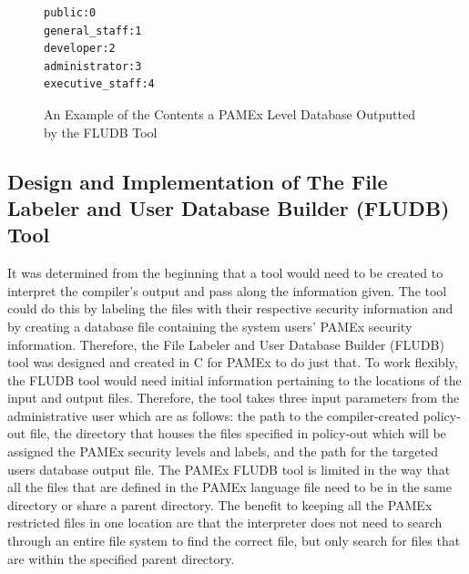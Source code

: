 \begin{figure}[htb]
    \centering
    \begin{tcolorbox}[width=.3\textwidth, boxsep=5pt, sharp corners, colback=white, colframe=black, fontupper=\footnotesize\ttfamily] %
        \begin{minipage}{\textwidth} %
            \begin{lstlisting}
public:0
general_staff:1
developer:2
administrator:3
executive_staff:4
            \end{lstlisting}
        \end{minipage}
    \end{tcolorbox}
    \caption[PAMEx Level Database Example]{\label{leveldb}An Example of the Contents a PAMEx Level Database Outputted by the FLUDB Tool}
\end{figure}


\vspace{\baselineskip}

\subsection{Design and Implementation of The File Labeler and User Database Builder (FLUDB) Tool}
\par 
\vspace{\baselineskip}
\hspace{1em}
It was determined from the beginning that a tool would need to be 
created to interpret the compiler’s output and pass along the 
information given. The tool could do this by labeling the files with 
their respective security information and by creating a database file 
containing the system users’ PAMEx security information. Therefore, the 
File Labeler and User Database Builder (FLUDB) tool was designed and 
created in C for PAMEx to do just that. To work flexibly, the FLUDB 
tool would need initial information pertaining to the locations of the 
input and output files. Therefore, the tool takes three input 
parameters from the administrative user which are as follows: the path to the compiler-created 
policy-out file, the directory that houses the files specified in 
policy-out which will be assigned the PAMEx security levels and labels, 
and the path for the targeted users database output file. The PAMEx 
FLUDB tool is limited in the way that all the files that are defined 
in the PAMEx language file need to be in the same directory or share a 
parent directory. The benefit to keeping all the PAMEx restricted 
files in one location are that the interpreter does not need to search 
through an entire file system to find the correct file, but only search
for files that are within the specified parent directory.

